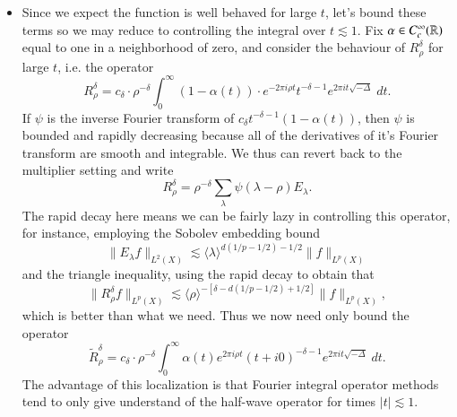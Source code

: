 \begin{itemize}
    \item Since we expect the function is well behaved for large $t$, let's bound these terms so we may reduce to controlling the integral over $t \lesssim 1$. Fix $\alpha \in C_c^\infty(\operatorname{\mathbb{R}})$ equal to one in a neighborhood of zero, and consider the behaviour of $R^\delta_\rho$ for large $t$, i.e. the operator
    \[ R^\delta_\rho = c_\delta \cdot \rho^{-\delta} \int_0^\infty (1 - \alpha(t)) \cdot e^{- 2 \pi i \rho t} t^{-\delta - 1} e^{2 \pi i t \sqrt{-\Delta}}\; dt. \]
    If $\psi$ is the inverse Fourier transform of $c_\delta t^{-\delta-1} (1 - \alpha(t))$, then $\psi$ is bounded and rapidly decreasing because all of the derivatives of it's Fourier transform are smooth and integrable. We thus can revert back to the multiplier setting and write
    \[ R^\delta_\rho = \rho^{-\delta} \sum_\lambda \psi(\lambda - \rho) E_\lambda. \]
    The rapid decay here means we can be fairly lazy in controlling this operator, for instance, employing the Sobolev embedding bound
    \[ \| E_\lambda f \|_{L^2(X)} \lesssim \langle \lambda \rangle^{d(1/p - 1/2) - 1/2} \| f \|_{L^p(X)} \]
    and the triangle inequality, using the rapid decay to obtain that
    \[ \| R^\delta_\rho f \|_{L^p(X)} \lesssim \langle \rho \rangle^{-[\delta - d(1/p - 1/2) + 1/2]} \| f \|_{L^p(X)}, \]
    which is better than what we need. Thus we now need only bound the operator
    \[ \tilde{R}^\delta_\rho = c_\delta \cdot \rho^{-\delta} \int_0^\infty \alpha(t) e^{2 \pi i \rho t} (t + i0)^{-\delta - 1} e^{2 \pi i t \sqrt{-\Delta}}\; dt. \]
    The advantage of this localization is that Fourier integral operator methods tend to only give understand of the half-wave operator for times $|t| \lesssim 1$.


\end{itemize}
